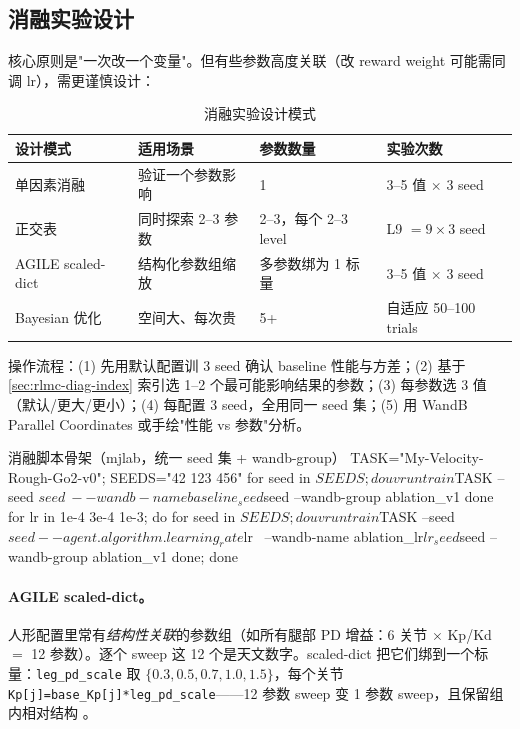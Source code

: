 \subsection{消融实验设计}

核心原则是"一次改一个变量"。但有些参数高度关联（改 reward weight 可能需同调 lr），需更谨慎设计：

\begin{table}[H]
\centering
\caption{消融实验设计模式}
\label{tab:rlmc-diag-ablation}
\begin{tabular}{p{3.0cm}p{3.6cm}p{3.0cm}p{3.0cm}}
\hline
设计模式 & 适用场景 & 参数数量 & 实验次数 \\
\hline
单因素消融 & 验证一个参数影响 & 1 & 3--5 值 $\times$ 3 seed \\
正交表 & 同时探索 2--3 参数 & 2--3，每个 2--3 level & L9 $=9\times3$ seed \\
AGILE scaled-dict & 结构化参数组缩放 & 多参数绑为 1 标量 & 3--5 值 $\times$ 3 seed \\
Bayesian 优化 & 空间大、每次贵 & 5+ & 自适应 50--100 trials \\
\hline
\end{tabular}
\end{table}

操作流程：(1) 先用默认配置训 3 seed 确认 baseline 性能与方差；(2) 基于 \cref{sec:rlmc-diag-index} 索引选 1--2 个最可能影响结果的参数；(3) 每参数选 3 值（默认/更大/更小）；(4) 每配置 3 seed，全用同一 seed 集；(5) 用 WandB Parallel Coordinates 或手绘"性能 vs 参数"分析。

\begin{codebox}[bash]{消融脚本骨架（mjlab，统一 seed 集 + wandb-group）}
TASK="My-Velocity-Rough-Go2-v0"; SEEDS="42 123 456"
for seed in $SEEDS; do
  uv run train $TASK --seed $seed \
    --wandb-name baseline_seed${seed} --wandb-group ablation_v1
done
for lr in 1e-4 3e-4 1e-3; do for seed in $SEEDS; do
  uv run train $TASK --seed $seed --agent.algorithm.learning_rate $lr \
    --wandb-name ablation_lr${lr}_seed${seed} --wandb-group ablation_v1
done; done
\end{codebox}

\paragraph{AGILE scaled-dict。}人形配置里常有\emph{结构性关联}的参数组（如所有腿部 PD 增益：6 关节 $\times$ Kp/Kd $=$ 12 参数）。逐个 sweep 这 12 个是天文数字。scaled-dict 把它们绑到一个标量：\verb|leg_pd_scale| 取 $\{0.3,0.5,0.7,1.0,1.5\}$，每个关节 \verb|Kp[j]=base_Kp[j]*leg_pd_scale|——12 参数 sweep 变 1 参数 sweep，且保留组内相对结构 \cite{nvidia2026agile}。

